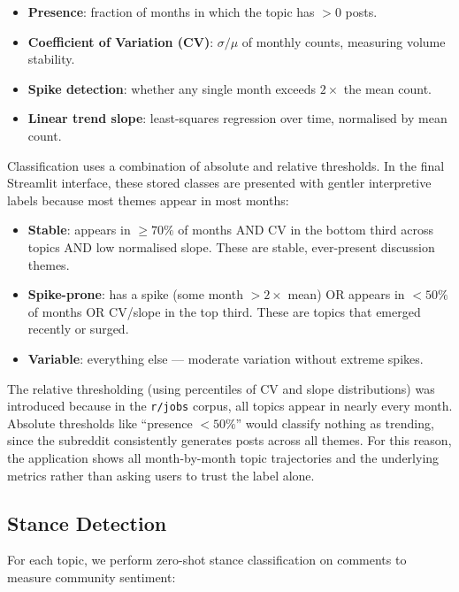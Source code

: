 \documentclass[11pt,a4paper]{article}
\begin{document}
\begin{itemize}[leftmargin=*]
  \item \textbf{Presence}: fraction of months in which the topic has $> 0$ posts.
  \item \textbf{Coefficient of Variation (CV)}: $\sigma / \mu$ of monthly counts, measuring volume stability.
  \item \textbf{Spike detection}: whether any single month exceeds $2\times$ the mean count.
  \item \textbf{Linear trend slope}: least-squares regression over time, normalised by mean count.
\end{itemize}

Classification uses a combination of absolute and relative thresholds. In the
final Streamlit interface, these stored classes are presented with gentler
interpretive labels because most themes appear in most months:

\begin{itemize}[leftmargin=*]
  \item \textbf{Stable}: appears in $\geq 70\%$ of months AND CV in the bottom third across topics AND low normalised slope. These are stable, ever-present discussion themes.
  \item \textbf{Spike-prone}: has a spike (some month $> 2\times$ mean) OR appears in $< 50\%$ of months OR CV/slope in the top third. These are topics that emerged recently or surged.
  \item \textbf{Variable}: everything else --- moderate variation without extreme spikes.
\end{itemize}

The relative thresholding (using percentiles of CV and slope distributions) was introduced because in the \texttt{r/jobs} corpus, all topics appear in nearly every month. Absolute thresholds like ``presence $< 50\%$'' would classify nothing as trending, since the subreddit consistently generates posts across all themes. For this reason, the application shows all month-by-month topic trajectories and the underlying metrics rather than asking users to trust the label alone.


\subsection{Stance Detection}
\label{sec:stance}

For each topic, we perform zero-shot stance classification on comments to measure community sentiment:
\end{document}
